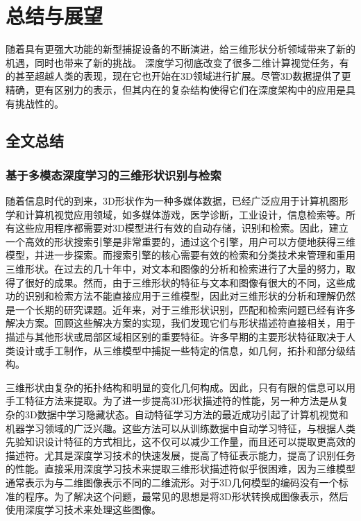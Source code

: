 \chapter{总结与展望}

随着具有更强大功能的新型捕捉设备的不断演进，给三维形状分析领域带来了新的机遇，同时也带来了新的挑战。 深度学习彻底改变了很多二维计算视觉任务，有的甚至超越人类的表现，现在它也开始在3D领域进行扩展。尽管3D数据提供了更精确，更有区别力的表示，但其内在的复杂结构使得它们在深度架构中的应用是具有挑战性的。

\section{全文总结}

\subsection{基于多模态深度学习的三维形状识别与检索}
随着信息时代的到来，3D形状作为一种多媒体数据，已经广泛应用于计算机图形学和计算机视觉应用领域，如多媒体游戏，医学诊断，工业设计，信息检索等。所有这些应用程序都需要对3D模型进行有效的自动存储，识别和检索。因此，建立一个高效的形状搜索引擎是非常重要的，通过这个引擎，用户可以方便地获得三维模型，并进一步探索。而搜索引擎的核心需要有效的检索和分类技术来管理和重用三维形状。在过去的几十年中，对文本和图像的分析和检索进行了大量的努力，取得了很好的成果。然而，由于三维形状的特征与文本和图像有很大的不同，这些成功的识别和检索方法不能直接应用于三维模型，因此对三维形状的分析和理解仍然是一个长期的研究课题。近年来，对于三维形状识别，匹配和检索问题已经有许多解决方案。回顾这些解决方案的实现，我们发现它们与形状描述符直接相关，用于描述与其他形状或局部区域相区别的重要特征。许多早期的主要形状特征取决于人类设计或手工制作，从三维模型中捕捉一些特定的信息，如几何，拓扑和部分级结构。

三维形状由复杂的拓扑结构和明显的变化几何构成。因此，只有有限的信息可以用手工特征方法来提取。为了进一步提高3D形状描述符的性能，另一种方法是从复杂的3D数据中学习隐藏状态。自动特征学习方法的最近成功引起了计算机视觉和机器学习领域的广泛兴趣。这些方法可以从训练数据中自动学习特征，与根据人类先验知识设计特征的方式相比，这不仅可以减少工作量，而且还可以提取更高效的描述符。尤其是深度学习技术的快速发展，提高了特征表示能力，提高了识别任务的性能。直接采用深度学习技术来提取三维形状描述符似乎很困难，因为三维模型通常表示为与二维图像表示不同的二维流形。对于3D几何模型的编码没有一个标准的程序。为了解决这个问题，最常见的思想是将3D形状转换成图像表示，然后使用深度学习技术来处理这些图像。

